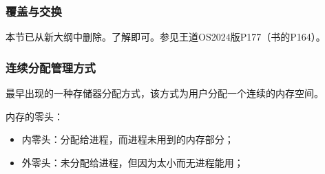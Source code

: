 \documentclass[12pt, a4paper, oneside]{ctexart}
\begin{document}
\subsubsection{覆盖与交换}

本节已从新大纲中删除。了解即可。参见王道OS2024版P177（书的P164）。

\subsubsection{连续分配管理方式}

最早出现的一种存储器分配方式，该方式为用户分配一个连续的内存空间。

内存的零头：
\begin{itemize}
  \item 内零头：分配给进程，而进程未用到的内存部分；
  \item 外零头：未分配给进程，但因为太小而无进程能用；
\end{itemize}
\end{document}
